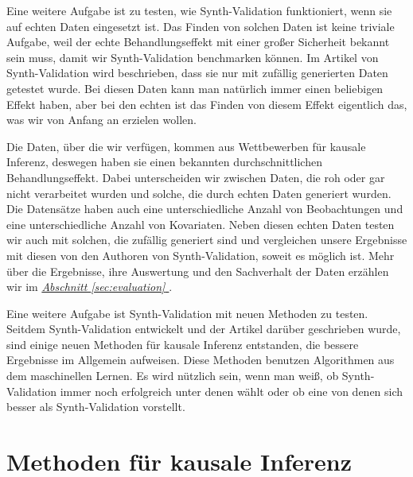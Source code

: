 \documentclass[12pt,a4paper,twoside]{scrartcl}
\numberwithin{equation}{section}
\newcommand{\refsec}[1]{\emph{\hyperref[#1]{Abschnitt \ref*{#1} }}}
\begin{document}
\noindent
Eine weitere Aufgabe ist zu testen, wie Synth-Validation funktioniert, wenn sie auf echten Daten eingesetzt ist. Das Finden von solchen Daten ist keine triviale Aufgabe, weil der echte Behandlungseffekt mit einer großer Sicherheit bekannt sein muss, damit wir Synth-Validation benchmarken können. Im Artikel von Synth-Validation wird beschrieben, dass sie nur mit zufällig generierten Daten getestet wurde. Bei diesen Daten kann man natürlich immer einen beliebigen Effekt haben, aber bei den echten ist das Finden von diesem Effekt eigentlich das, was wir von Anfang an erzielen wollen.\par

\noindent
Die Daten, über die wir verfügen, kommen aus Wettbewerben für kausale Inferenz, deswegen haben sie einen bekannten durchschnittlichen Behandlungseffekt. Dabei unterscheiden wir zwischen Daten, die roh oder gar nicht verarbeitet wurden und solche, die durch echten Daten generiert wurden. Die Datensätze haben auch eine unterschiedliche Anzahl von Beobachtungen und eine unterschiedliche Anzahl von Kovariaten. Neben diesen echten Daten testen wir auch mit solchen, die zufällig generiert sind und vergleichen unsere Ergebnisse mit diesen von den Authoren von Synth-Validation, soweit es möglich ist. Mehr über die Ergebnisse, ihre Auswertung und den Sachverhalt der Daten erzählen wir im \refsec{sec:evaluation}.\par 

\noindent
Eine weitere Aufgabe ist Synth-Validation mit neuen Methoden zu testen. Seitdem Synth-Validation entwickelt und der Artikel darüber geschrieben wurde, sind einige neuen Methoden für kausale Inferenz entstanden, die bessere Ergebnisse im Allgemein aufweisen. Diese Methoden benutzen Algorithmen aus dem maschinellen Lernen. Es wird nützlich sein, wenn man weiß, ob Synth-Validation immer noch erfolgreich unter denen wählt oder ob eine von denen sich besser als Synth-Validation vorstellt.\par

\clearpage

\section{Methoden für kausale Inferenz}\label{sec:methoden}
\end{document}

